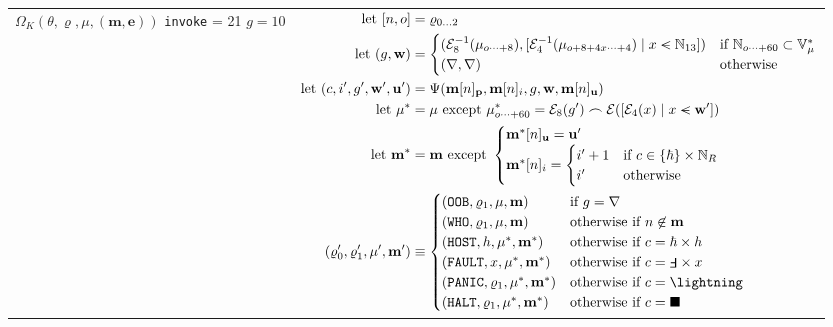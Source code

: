 \begin{longtable}{p{3.5cm} p{12.5cm}}
  \cmidrule(lr){1-1}\cmidrule(lr){2-2}
  \makecell*[l]{
  $\Omega_K(\theta, \varrho, \mu, (\mathbf{m}, \mathbf{e}))$ \\
  \texttt{invoke} = 21 \\
  $g = 10$} &
  $\begin{aligned}
    \using [n, o] &= \varrho_{0 \dots 2} \\
    \using (g, \mathbf{w}) &= \begin{cases}
      (\de_8(\mem_{o\dots+8}), [\de_4(\mem_{o+8+4x\dots+4}) \mid x \orderedin \N_{13}]) &\when \N_{o \dots+ 60} \subset \mathbb{V}^*_{\mem} \\
      (\error, \error) &\otherwise
    \end{cases} \\
    \using (c, i', g', \mathbf{w}', \mathbf{u}') &= \Psi(\mathbf{m}[n]_\mathbf{p}, \mathbf{m}[n]_i, g, \mathbf{w}, \mathbf{m}[n]_\mathbf{u})\\
    \using \mem^* &= \mem \exc \mem^*_{o\dots+60} = \se_8(g') \concat \se([\se_4(x) \mid x \orderedin \mathbf{w}'])\\
    \using \mathbf{m}^* &= \mathbf{m} \exc \begin{cases}
      \mathbf{m}^*[n]_\mathbf{u} = \mathbf{u}'\\
      \mathbf{m}^*[n]_i = \begin{cases}
        i' + 1 &\when c \in \{ \host \} \times \N_R\\
        i' &\otherwise
      \end{cases}
    \end{cases}\\
    (\varrho'_0, \varrho'_1, \mem', \mathbf{m}') &\equiv \begin{cases}
      (\mathtt{OOB}, \varrho_1, \mem, \mathbf{m}) &\when g = \error \\
      (\mathtt{WHO}, \varrho_1, \mem, \mathbf{m}) &\otherwhen n \not\in \mathbf{m} \\
      (\mathtt{HOST}, h, \mem^*, \mathbf{m}^*) &\otherwhen c = \host \times h \\
      (\mathtt{FAULT}, x, \mem^*, \mathbf{m}^*) &\otherwhen c = \fault \times x \\
      (\mathtt{PANIC}, \varrho_1, \mem^*, \mathbf{m}^*) &\otherwhen c = \panic \\
      (\mathtt{HALT}, \varrho_1, \mem^*, \mathbf{m}^*) &\otherwhen c = \halt \\
    \end{cases} \\
  \end{aligned}$\\

\end{longtable}
